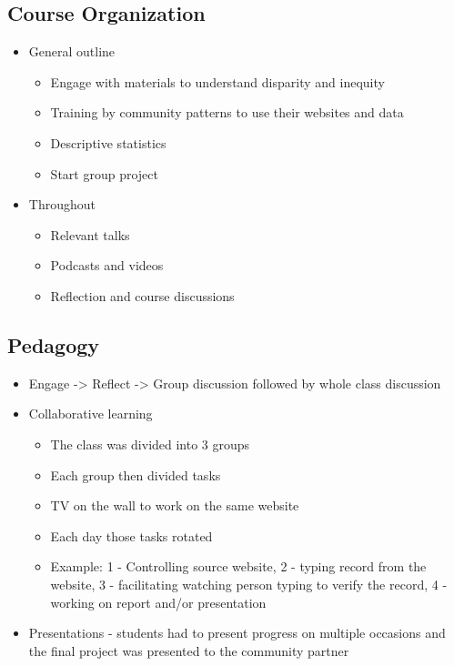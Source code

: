 \documentclass[
  letterpaper,
  DIV=11,
  numbers=noendperiod]{scrartcl}
\providecommand{\tightlist}{%
  \setlength{\itemsep}{0pt}\setlength{\parskip}{0pt}}\usepackage{longtable,booktabs,array}
\begin{document}
\subsection{Course Organization}\label{course-organization}

\begin{itemize}
\tightlist
\item
  General outline

  \begin{itemize}
  \tightlist
  \item
    Engage with materials to understand disparity and inequity
  \item
    Training by community patterns to use their websites and data
  \item
    Descriptive statistics
  \item
    Start group project
  \end{itemize}
\item
  Throughout

  \begin{itemize}
  \tightlist
  \item
    Relevant talks
  \item
    Podcasts and videos
  \item
    Reflection and course discussions
  \end{itemize}
\end{itemize}

\subsection{Pedagogy}\label{pedagogy}

\begin{itemize}
\item
  Engage -\textgreater{} Reflect -\textgreater{} Group discussion
  followed by whole class discussion
\item
  Collaborative learning

  \begin{itemize}
  \tightlist
  \item
    The class was divided into 3 groups
  \item
    Each group then divided tasks
  \item
    TV on the wall to work on the same website
  \item
    Each day those tasks rotated
  \item
    Example: 1 - Controlling source website, 2 - typing record from the
    website, 3 - facilitating watching person typing to verify the
    record, 4 - working on report and/or presentation
  \end{itemize}
\item
  Presentations - students had to present progress on multiple occasions
  and the final project was presented to the community partner
\end{itemize}
\end{document}
